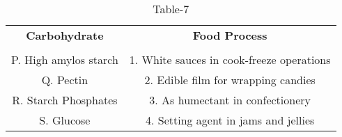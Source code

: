 \begin{table}[htbp]
  \centering
  \caption{Table-7}
  \label{table7}
  \begin{tabular}{cc}
  \textbf{Carbohydrate} & \textbf{Food Process} \\ \\
    P. High amylos starch & 1. White sauces in cook-freeze operations \\
    Q. Pectin & 2. Edible  film for wrapping candies \\
    R. Starch Phosphates & 3. As humectant in confectionery \\
    S. Glucose & 4. Setting agent in jams and jellies \\
  \end{tabular}
\end{table}
